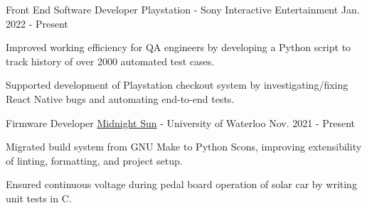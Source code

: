 

\begin{cventries}


  \cventry
    {Front End Software Developer} %
    {Playstation - Sony Interactive Entertainment} %
    {} %
    {Jan. 2022 - Present} %
    {
      \begin{cvitems} %
        \item {Improved working efficiency for QA engineers by developing a Python script to track history of over 2000 automated test cases.}
        \item {Supported development of Playstation checkout system by investigating/fixing React Native bugs and automating end-to-end tests.}
      \end{cvitems}
    }


  \cventry
    {Firmware Developer} %
    {\href{https://www.uwmidsun.com/}{Midnight Sun} - University of Waterloo} %
    {} %
    {Nov. 2021 - Present} %
    {
      \begin{cvitems} %
        \item {Migrated build system from GNU Make to Python Scons, improving extensibility of linting, formatting, and project setup.}
        \item {Ensured continuous voltage during pedal board operation of solar car by writing unit tests in C.}
      \end{cvitems}
    }


\end{cventries}
